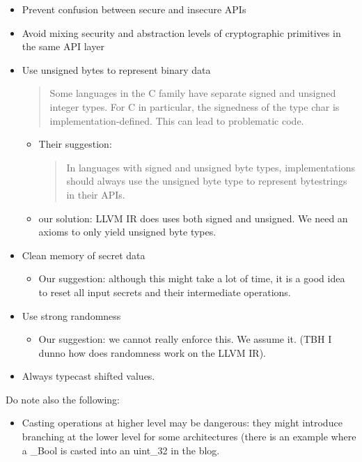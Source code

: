 \begin{itemize}
\item Prevent confusion between secure and insecure APIs
\item Avoid mixing security and abstraction levels of cryptographic primitives in the same API layer
\item Use unsigned bytes to represent binary data
\begin{quote}
Some languages in the C family have separate signed and unsigned integer types. For C in particular, the signedness of the type char is implementation-defined. This can lead to problematic code.
\end{quote}
\begin{itemize}
\item Their suggestion:
\begin{quote}
In languages with signed and unsigned byte types, implementations should always use the unsigned byte type to represent bytestrings in their APIs.
\end{quote}
\item our solution: LLVM IR does uses both signed and unsigned. We need an axioms to only yield unsigned byte types.
\end{itemize}
\item Clean memory of secret data
\begin{itemize}
\item Our suggestion: although this might take a lot of time, it is a good idea to reset all input secrets and their intermediate operations. 
\end{itemize}
\item Use strong randomness
\begin{itemize}
\item Our suggestion: we cannot really enforce this. We assume it. (TBH I dunno how does randomness work on the LLVM IR).
\end{itemize}
\item Always typecast shifted values.
\end{itemize}

Do note also the following:
\begin{itemize}
\item Casting operations at higher level may be dangerous: they might introduce branching at the lower level for some architectures (there is an example where a \_Bool is casted into an uint\_32 in the blog.
\end{itemize}
